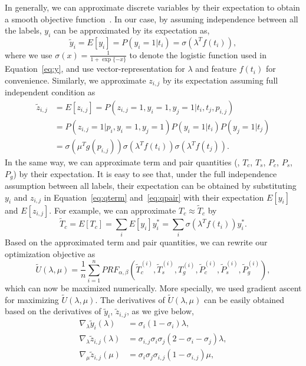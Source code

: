 In generally, we can approximate discrete variables by their expectation to obtain a smooth objective function~\cite{jansche2005maximum}. In our case, by assuming independence between all the labels, $y_i$ can be approximated by its expectation as, 
\begin{equation}
 \widetilde{y}_i = E[y_i]= P(y_i\!=\!1|t_i)= \sigma(\lambda^T f(t_i)),
\end{equation}
where we use $\sigma(x)=\frac{1}{1+\exp\{-x\}}$ to denote the logistic function used in Equation~\ref{eq:y}, and use vector-representation for $\lambda$ and feature $f(t_i)$ for convenience. Similarly, we approximate $z_{i,j}$ by its expectation assuming full independent condition as
\begin{equation}
\begin{split}
 \widetilde{z}_{i,j} &= E[z_{i,j}]= P(z_{i,j}\!=\!1,y_i\!=\!1,y_j\!=\!1|t_i,t_j,p_{i,j})\\
  &=P(z_{i,j}\!=\!1|p_i,y_i\!=\!1,y_j\!=\!1)P(y_i\!=\!1|t_i)P(y_j\!=\!1|t_j)\\
    &= \sigma(\mu^T g(p_{i,j}))\sigma(\lambda^T f(t_i))\sigma(\lambda^T f(t_j)).
\end{split}
\end{equation}
In the same way, we can approximate term and pair quantities (\ie, $T_c$, $T_s$, $P_c$, $P_s$, $P_g$) by their expectation. It is easy to see that, under the full independence assumption between all labels, their expectation can be obtained by substituting $y_i$ and $z_{i,j}$ in Equation~\ref{eq:qterm} and~\ref{eq:qpair} with their expectation $E[y_i]$ and $E[z_{i,j}]$. For example, we can approximate $T_c\approx \widetilde{T}_c$ by
\begin{equation}
 \widetilde{T}_c = E[T_c] = \sum_i{E[y_i]y_i^*}=\sum_i {\sigma(\lambda^T f(t_i))y_i^*}.
\end{equation}
Based on the approximated term and pair quantities, we can rewrite our optimization objective as 
\begin{equation}
 \widetilde{U}(\lambda,\mu)=\frac{1}{n}\sum_{i=1}^{n}P\!R\!F_{\alpha,\beta}(\widetilde{T}_c^{(i)},\widetilde{T}_s^{(i)},T_g^{(i)},\widetilde{P}_c^{(i)},\widetilde{P}_s^{(i)},\widetilde{P}_g^{(i)}),
\end{equation}
which can now be maximized numerically. More specially, we used gradient ascent for maximizing $\widetilde{U}(\lambda,\mu)$. The derivatives of $\widetilde{U}(\lambda,\mu)$ can be easily obtained based on the derivatives of $\widetilde{y}_i$, $\widetilde{z}_{i,j}$, as we give below,
\begin{equation}
 \begin{split}
  \nabla_{\lambda}\widetilde{y}_i(\lambda) &= \sigma_i (1-\sigma_i)\lambda, \\
  \nabla_{\lambda}\widetilde{z}_{i,j}(\lambda) &= \sigma_{i,j}\sigma_i\sigma_j(2-\sigma_i-\sigma_j)\lambda, \\
\nabla_{\mu}\widetilde{z}_{i,j}(\mu) &= \sigma_i\sigma_j\sigma_{i,j}(1-\sigma_{i,j})\mu,\\
 \end{split}
\end{equation}
